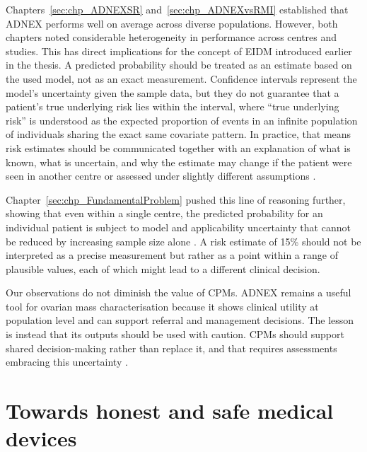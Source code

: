 Chapters~\ref{sec:chp_ADNEXSR} and~\ref{sec:chp_ADNEXvsRMI} established that \gls{ADNEX} performs well on average across diverse populations. However, both chapters noted considerable heterogeneity in performance across centres and studies. This has direct implications for the concept of \gls{EIDM} introduced earlier in the thesis. A predicted probability should be treated as an estimate based on the used model, not as an exact measurement. Confidence intervals represent the model's uncertainty given the sample data, but they do not guarantee that a patient's true underlying risk lies within the interval, where \enquote{true underlying risk} is understood as the expected proportion of events in an infinite population of individuals sharing the exact same covariate pattern. In practice, that means risk estimates should be communicated together with an explanation of what is known, what is uncertain, and why the estimate may change if the patient were seen in another centre or assessed under slightly different assumptions \cite{pateUncertaintyUsingRisk2019, rileyUncertaintyRiskEstimates2025, aldermanTacklingAlgorithmicBias2025, ganapathiTacklingBiasAI2022}.

Chapter~\ref{sec:chp_FundamentalProblem} pushed this line of reasoning further, showing that even within a single centre, the predicted probability for an individual patient is subject to model and applicability uncertainty that cannot be reduced by increasing sample size alone \cite{pateUncertaintyUsingRisk2019, rileyUncertaintyRiskEstimates2025}. A risk estimate of 15\% should not be interpreted as a precise measurement but rather as a point within a range of plausible values, each of which might lead to a different clinical decision.

Our observations do not diminish the value of \glspl{CPM}. \gls{ADNEX} remains a useful tool for ovarian mass characterisation because it shows clinical utility at population level and can support referral and management decisions. The lesson is instead that its outputs should be used with caution. \glspl{CPM} should support shared decision-making rather than replace it, and that requires assessments embracing this uncertainty \cite{moonsCriticalAppraisalData2014, steyerbergClinicalPredictionModels2009}.

\section{Towards honest and safe medical devices}

